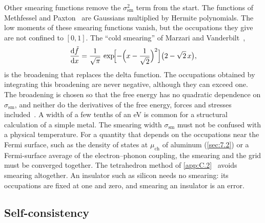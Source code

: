 Other smearing functions remove the $\sigma_{\mathrm{sm}}^2$ term from the start. The functions of Methfessel and Paxton~\cite{methfessel1989high} are Gaussians multiplied by Hermite polynomials. The low moments of these smearing functions vanish, but the occupations they give are not confined to $[0, 1]$. The ``cold smearing'' of Marzari and Vanderbilt~\cite[Eq.~(1)]{marzari1999thermal},
\begin{equation}
  \frac{\mathrm{d}\tilde f}{\mathrm{d} x} = \frac{1}{\sqrt{\pi}}\,\exp\!\Bigl[-\Bigl(x - \frac{1}{\sqrt{2}}\Bigr)^2\Bigr]\bigl(2 - \sqrt{2}\,x\bigr),
  \label{eq:E.1-cold}
\end{equation}
is the broadening that replaces the delta function. The occupations obtained by integrating this broadening are never negative, although they can exceed one. The broadening is chosen so that the free energy has no quadratic dependence on $\sigma_{\mathrm{sm}}$, and neither do the derivatives of the free energy, forces and stresses included~\cite{marzari1999thermal}. A width of a few tenths of an eV is common for a structural calculation of a simple metal. The smearing width $\sigma_{\mathrm{sm}}$ must not be confused with a physical temperature. For a quantity that depends on the occupations near the Fermi surface, such as the density of states at $\mu_{\mathrm{ch}}$ of aluminum (\cref{sec:7.2}) or a Fermi-surface average of the electron--phonon coupling, the smearing and the grid must be converged together. The tetrahedron method of \cref{app:C.2}~\cite{blochl1994improved} avoids smearing altogether. An insulator such as silicon needs no smearing: its occupations are fixed at one and zero, and smearing an insulator is an error.

\subsection{Self-consistency}

